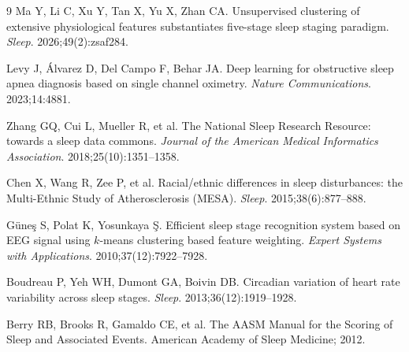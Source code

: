 \documentclass[11pt,a4paper]{article}
\begin{document}
\begin{thebibliography}{9}
\small
{}
Ma Y, Li C, Xu Y, Tan X, Yu X, Zhan CA.
Unsupervised clustering of extensive physiological features substantiates
five-stage sleep staging paradigm.
\emph{Sleep}. 2026;49(2):zsaf284.

Levy J, \'Alvarez D, Del Campo F, Behar JA.
Deep learning for obstructive sleep apnea diagnosis based on single channel
oximetry.
\emph{Nature Communications}. 2023;14:4881.

Zhang GQ, Cui L, Mueller R, et al.
The National Sleep Research Resource: towards a sleep data commons.
\emph{Journal of the American Medical Informatics Association}.
2018;25(10):1351--1358.

Chen X, Wang R, Zee P, et al.
Racial/ethnic differences in sleep disturbances: the Multi-Ethnic Study of
Atherosclerosis (MESA).
\emph{Sleep}. 2015;38(6):877--888.

Güne\c{s} S, Polat K, Yosunkaya \c{S}.
Efficient sleep stage recognition system based on EEG signal using $k$-means
clustering based feature weighting.
\emph{Expert Systems with Applications}. 2010;37(12):7922--7928.

Boudreau P, Yeh WH, Dumont GA, Boivin DB.
Circadian variation of heart rate variability across sleep stages.
\emph{Sleep}. 2013;36(12):1919--1928.

Berry RB, Brooks R, Gamaldo CE, et al.
The AASM Manual for the Scoring of Sleep and Associated Events.
American Academy of Sleep Medicine; 2012.
\end{thebibliography}
\end{document}
